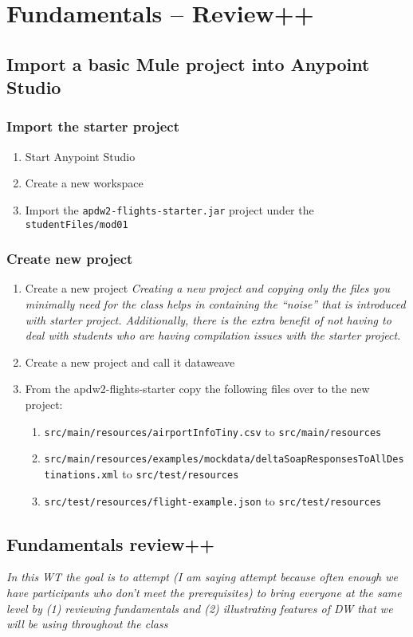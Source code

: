 \chapter{Fundamentals -- Review++}
\section{Import a basic Mule project into Anypoint Studio}
\subsection{Import the starter project}
\begin{enumerate}
\item Start Anypoint Studio
\item Create a new workspace
\item Import the \texttt{apdw2-flights-starter.jar} project under the \texttt{studentFiles/mod01}
\end{enumerate}
\subsection{Create new project}
\begin{enumerate}[resume*]
\item Create a new project
  \newline
  \emph{
    Creating a new project and copying only the files you minimally need for the class helps in containing the ``noise'' that is introduced with starter project.  Additionally, there is the extra benefit of not having to deal with students who are having compilation issues with the starter project.
  }
\item Create a new project and call it dataweave
\item From the apdw2-flights-starter copy the following files over to the new project:
  \begin{enumerate}
  \item \texttt{src/main/resources/airportInfoTiny.csv} to \texttt{src/main/resources}
  \item \texttt{src/main/resources/examples/mockdata/deltaSoapResponsesToAllDestinations.xml} to \texttt{src/test/resources}
  \item \texttt{src/test/resources/flight-example.json} to \texttt{src/test/resources}
  \end{enumerate}
\end{enumerate}

\section{Fundamentals review++}
\emph{
  In this WT the goal is to attempt (I am saying attempt because often enough we have participants who don’t meet the prerequisites) to bring everyone at the same level by (1) reviewing fundamentals and (2) illustrating features of DW that we will be using throughout the class
}

